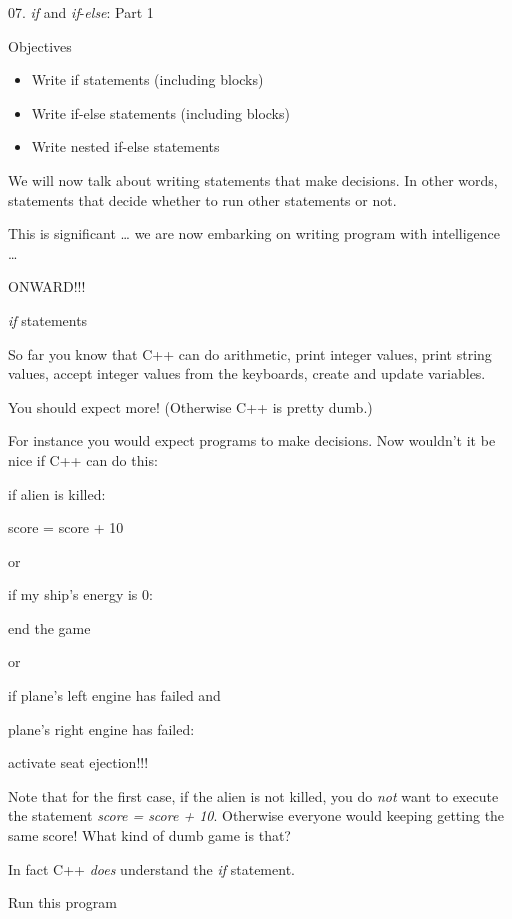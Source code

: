 \documentclass[
]{article}
\author{}
\date{}
\providecommand{\tightlist}{%
  \setlength{\itemsep}{0pt}\setlength{\parskip}{0pt}}
\begin{document}
07. \emph{if} and \emph{if}-\emph{else}: Part 1

Objectives

\begin{itemize}
\tightlist
\item
  Write if statements (including blocks)
\item
  Write if-else statements (including blocks)
\item
  Write nested if-else statements
\end{itemize}

We will now talk about writing statements that make decisions. In other
words, statements that decide whether to run other statements or not.

This is significant \ldots{} we are now embarking on writing program
with intelligence \ldots{}

ONWARD!!!

\emph{if} statements

So far you know that C++ can do arithmetic, print integer values, print
string values, accept integer values from the keyboards, create and
update variables.

You should expect more! (Otherwise C++ is pretty dumb.)

For instance you would expect programs to make decisions. Now wouldn't
it be nice if C++ can do this:

if alien is killed:

score = score + 10

or

if my ship's energy is 0:

end the game

or

if plane's left engine has failed and

plane's right engine has failed:

activate seat ejection!!!

Note that for the first case, if the alien is not killed, you do
\emph{not} want to execute the statement \emph{score = score + 10}.
Otherwise everyone would keeping getting the same score! What kind of
dumb game is that?

In fact C++ \emph{does} understand the \emph{if} statement.

Run this program

\begin{longtable}[]{@{}@{}}
\toprule
\endhead
\bottomrule
\end{longtable}
\end{document}
